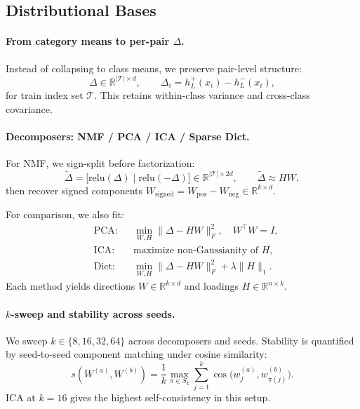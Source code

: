 \subsection{Distributional Bases}
\label{sec:dev:basis}

\paragraph{From category means to per-pair $\Delta$.}
\label{sec:dev:basis:delta}
Instead of collapsing to class means, we preserve pair-level structure:
\begin{equation}
  \Delta \in \mathbb{R}^{|\mathcal{T}|\times d},
  \qquad
  \Delta_i = h_L^{+}(x_i)-h_L^{-}(x_i),
\end{equation}
for train index set $\mathcal{T}$. This retains within-class variance and
cross-class covariance.

\paragraph{Decomposers: NMF / PCA / ICA / Sparse Dict.}
\label{sec:dev:basis:decomposers}
For NMF, we sign-split before factorization:
\begin{equation}
  \tilde{\Delta}=\bigl[\mathrm{relu}(\Delta)\mid\mathrm{relu}(-\Delta)\bigr]
  \in\mathbb{R}^{|\mathcal{T}|\times 2d},
  \qquad
  \tilde{\Delta}\approx HW,
\end{equation}
then recover signed components
$W_{\text{signed}}=W_{\text{pos}}-W_{\text{neg}}\in\mathbb{R}^{k\times d}$.

For comparison, we also fit:
\begin{align}
  &\text{PCA:} &&\min_{W,H}\|\Delta-HW\|_F^2,\quad W^\top W=I,\\
  &\text{ICA:} &&\text{maximize non-Gaussianity of }H,\\
  &\text{Dict:} &&\min_{W,H}\|\Delta-HW\|_F^2+\lambda\|H\|_1.
\end{align}
Each method yields directions $W\in\mathbb{R}^{k\times d}$ and
loadings $H\in\mathbb{R}^{n\times k}$.

\paragraph{$k$-sweep and stability across seeds.}
\label{sec:dev:basis:sweep}
We sweep $k\in\{8,16,32,64\}$ across decomposers and seeds. Stability is
quantified by seed-to-seed component matching under cosine similarity:
\begin{equation}
  s(W^{(a)},W^{(b)})
  =\frac{1}{k}\max_{\pi\in S_k}\sum_{j=1}^{k}
  \cos\bigl(w^{(a)}_j,w^{(b)}_{\pi(j)}\bigr).
\end{equation}
ICA at $k=16$ gives the highest self-consistency in this setup.


